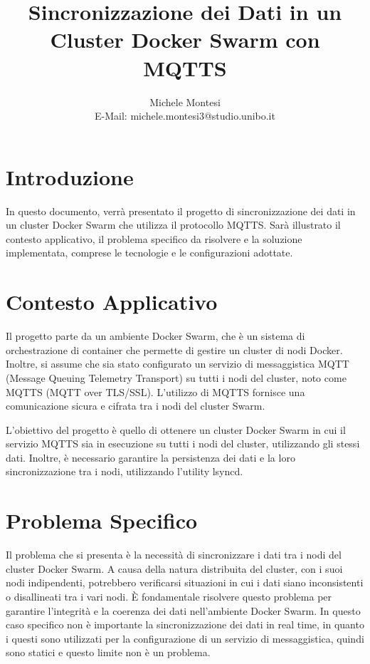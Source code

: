 \documentclass[a4paper, 12pt]{article}
\title{Sincronizzazione dei Dati in un Cluster Docker Swarm con MQTTS}
\author{Michele Montesi \\
        E-Mail: michele.montesi3@studio.unibo.it}
\begin{document}
\maketitle

\section{Introduzione}
In questo documento, verrà presentato il progetto di sincronizzazione 
dei dati in un cluster Docker Swarm che utilizza il protocollo MQTTS. 
Sarà illustrato il contesto applicativo, il problema specifico da risolvere e 
la soluzione implementata, comprese le tecnologie e le configurazioni adottate.

\section{Contesto Applicativo}
Il progetto parte da un ambiente Docker Swarm, che è un sistema di orchestrazione 
di container che permette di gestire un cluster di nodi Docker. Inoltre, si assume 
che sia stato configurato un servizio di messaggistica MQTT (Message Queuing Telemetry Transport) 
su tutti i nodi del cluster, noto come MQTTS (MQTT over TLS/SSL). 
L'utilizzo di MQTTS fornisce una comunicazione sicura e cifrata tra i nodi del cluster Swarm.

L'obiettivo del progetto è quello di ottenere un cluster Docker Swarm in cui il 
servizio MQTTS sia in esecuzione su tutti i nodi del cluster, utilizzando gli stessi dati. 
Inoltre, è necessario garantire la persistenza dei dati e la loro sincronizzazione tra i nodi, 
utilizzando l'utility lsyncd.

\newpage
\section{Problema Specifico}
Il problema che si presenta è la necessità di sincronizzare i dati tra i nodi del 
cluster Docker Swarm. A causa della natura distribuita del cluster, con i suoi nodi 
indipendenti, potrebbero verificarsi situazioni in cui i dati siano inconsistenti o disallineati 
tra i vari nodi. È fondamentale risolvere questo problema per garantire l'integrità e la coerenza 
dei dati nell'ambiente Docker Swarm.
In questo caso specifico non è importante la sincronizzazione dei dati in real time, in quanto
i questi sono utilizzati per la configurazione di un servizio di messaggistica,
quindi sono statici e questo limite non è un problema.
\end{document}
